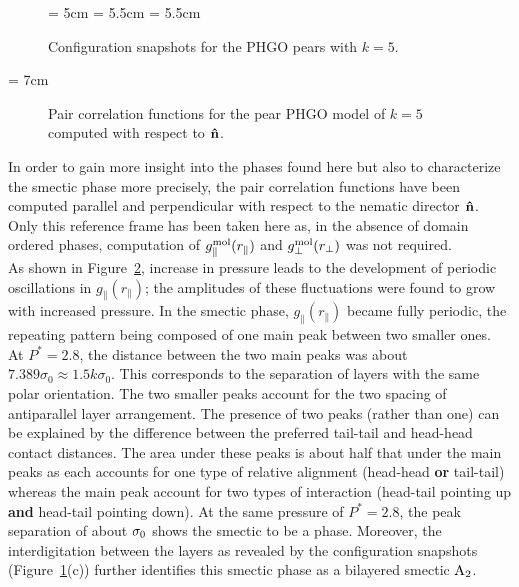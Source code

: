 
\begin{figure}
	\centering
	\picW = 5cm
	\hspace{2cm}
	\picW = 5.5cm
	\picW = 5.5cm
	\caption{Configuration snapshots for the PHGO pears with $k=5$.}
	\label{fig:GBP_k5_snaps}
\end{figure}


\picW = 7cm
\begin{figure}
	\centering
	\caption{Pair correlation functions for the pear PHGO model of $k=5$ computed with respect to 
	$\mathbf{\hat{n} }$.}
	\label{fig:GBP_k5_gr}
\end{figure}


In order to gain more insight into the phases found here but also to characterize the
smectic phase more precisely, the pair correlation functions have been computed parallel and 
perpendicular with respect to the nematic director $\mathbf{\hat{n} }$. Only this reference frame has
been taken here as, in the absence of domain ordered phases, 
computation of $g^{\mathrm{mol}}_\parallel(r_\parallel)$ and $g^{\mathrm{mol}}_\perp(r_\perp)$ was not
required.\\
%
As shown in Figure~\ref{fig:GBP_k5_gr}, increase in pressure leads to the development of
periodic oscillations in $g_\parallel(r_\parallel)$; the amplitudes of these fluctuations 
were found to grow with increased pressure. In the smectic phase, $g_\parallel(r_\parallel)$ 
became fully periodic, the repeating pattern being composed of one main 
peak between two smaller ones.\\
At $P^{*}=2.8$, the distance between the two main peaks was about  
$7.389\sigma_0 \approx 1.5k\sigma_0$. This corresponds to  the separation of layers with 
the same polar orientation. The two smaller peaks account for the two spacing of antiparallel 
layer arrangement.  The presence of two peaks (rather than one) can be explained by 
the difference between the preferred tail-tail and  head-head contact distances. The area under 
these peaks is about half that under the main peaks as each accounts for one type of 
relative alignment (head-head \textbf{or} tail-tail) whereas the main peak account for two 
types of interaction (head-tail pointing up \textbf{and} head-tail pointing down). At the same
pressure of $P^{*} = 2.8$, the peak separation of about $\sigma_0$ shows the smectic to be a \smA
phase. Moreover, the interdigitation between the layers as revealed by the configuration
snapshots (\eg Figure~\ref{fig:GBP_k5_snaps}(c)) further identifies this smectic phase as a
bilayered smectic $\mathrm{A_2}$.\\

